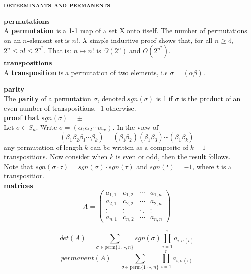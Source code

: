 \documentclass[a4paper]{article}
\begin{document}

\begin{multicols}{2}

\begin{framed}
	\begin{center}
		\textbf{\textsc{determinants and permanents}}
	\end{center}
	\textbf{permutations}\\
	A \textbf{permutation} is a 1-1 map of a set X onto itself. The number of permutations on an $n$-element set is $n!$. A simple inductive proof shows that, for all $n \geq 4$, $2^n \leq n! \leq 2^{n^2}$. That is: $n \mapsto n!$ is $\Omega(2^n)$ and $O(2^{n^2})$.\\
	
	\noindent
	\textbf{transpositions}\\
	A \textbf{transposition} is a permutation of two elements, i.e $\sigma = (\alpha\beta)$.
	
	\noindent
	\textbf{parity}\\
	The \textbf{parity} of a permutation $\sigma$, denoted $sgn(\sigma)$ is 1 if $\sigma$ is the product of an even number of transpositions, -1 otherwise.\\
	
	\noindent
	\textbf{proof that $sgn(\sigma) = \pm 1$}\\
	Let $\sigma \in S_n$. Write $\sigma = (\alpha_1 \alpha_2 \cdots \alpha_m)$. In the view of
	$$(\beta_1 \beta_2 \beta_3 \cdots \beta_k) = (\beta_1 \beta_2)(\beta_1 \beta_3) \cdots (\beta_1 \beta_k)$$
	any permutation of length $k$ can be written as a composite of $k - 1$ transpositions. Now consider when $k$ is even or odd, then the result follows.\\
	
	\noindent
	Note that $sgn(\sigma \cdot \tau) = sgn(\sigma) \cdot sgn(\tau)$ and $sgn(t) = -1$, where $t$ is a transposition.\\
	
	\noindent
	\textbf{matrices}\\
	$$A = 
 	\begin{pmatrix}
 	 a_{1,1} & a_{1,2} & \cdots & a_{1,n} \\
 	 a_{2,1} & a_{2,2} & \cdots & a_{2,n} \\
 	 \vdots  & \vdots  & \ddots & \vdots  \\
 	 a_{n,1} & a_{n,2} & \cdots & a_{n,n} 
 	\end{pmatrix}$$
 	
 	$$det(A) = \sum_{\sigma \in \text{perm}\{1, \cdots, n\}} sgn(\sigma)\prod^n_{i=1}a_{i,\sigma(i)}$$
 	$$permanent(A) = \sum_{\sigma \in \text{perm}\{1, \cdots, n\}} \prod^n_{i=1}a_{i,\sigma(i)}$$
	

\end{framed}
\end{multicols}
\end{document}
